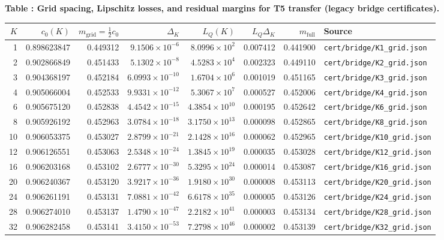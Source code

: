 \label{tab:T5-grid-lip}
\begin{center}
  \small\textbf{Table \thetable: Grid spacing, Lipschitz losses, and residual margins for T5 transfer (legacy bridge certificates).}
\end{center}
\begin{center}
  \small
  \begin{tabular}{rrrrrrrl}
    \toprule
    $K$ & $c_0(K)$ & $m_{\mathrm{grid}}=\tfrac{1}{2}c_0$ & $\Delta_K$ & $L_Q(K)$ & $L_Q\Delta_K$ & $m_{\mathrm{full}}$ & Source \\
    \midrule
    1 & 0.898623847 & 0.449312 & $9.1506\times 10^{-6}$ & $8.0996\times 10^{2}$ & 0.007412 & 0.441900 & \texttt{cert/bridge/K1\_grid.json} \\
    2 & 0.902866849 & 0.451433 & $5.1302\times 10^{-8}$ & $4.5283\times 10^{4}$ & 0.002323 & 0.449110 & \texttt{cert/bridge/K2\_grid.json} \\
    3 & 0.904368197 & 0.452184 & $6.0993\times 10^{-10}$ & $1.6704\times 10^{6}$ & 0.001019 & 0.451165 & \texttt{cert/bridge/K3\_grid.json} \\
    4 & 0.905066004 & 0.452533 & $9.9331\times 10^{-12}$ & $5.3067\times 10^{7}$ & 0.000527 & 0.452006 & \texttt{cert/bridge/K4\_grid.json} \\
    6 & 0.905675120 & 0.452838 & $4.4542\times 10^{-15}$ & $4.3854\times 10^{10}$ & 0.000195 & 0.452642 & \texttt{cert/bridge/K6\_grid.json} \\
    8 & 0.905926192 & 0.452963 & $3.0784\times 10^{-18}$ & $3.1750\times 10^{13}$ & 0.000098 & 0.452865 & \texttt{cert/bridge/K8\_grid.json} \\
    10 & 0.906053375 & 0.453027 & $2.8799\times 10^{-21}$ & $2.1428\times 10^{16}$ & 0.000062 & 0.452965 & \texttt{cert/bridge/K10\_grid.json} \\
    12 & 0.906126551 & 0.453063 & $2.5348\times 10^{-24}$ & $1.3845\times 10^{19}$ & 0.000035 & 0.453028 & \texttt{cert/bridge/K12\_grid.json} \\
    16 & 0.906203168 & 0.453102 & $2.6777\times 10^{-30}$ & $5.3295\times 10^{24}$ & 0.000014 & 0.453087 & \texttt{cert/bridge/K16\_grid.json} \\
    20 & 0.906240367 & 0.453120 & $3.9217\times 10^{-36}$ & $1.9180\times 10^{30}$ & 0.000008 & 0.453113 & \texttt{cert/bridge/K20\_grid.json} \\
    24 & 0.906261191 & 0.453131 & $7.0881\times 10^{-42}$ & $6.6178\times 10^{35}$ & 0.000005 & 0.453126 & \texttt{cert/bridge/K24\_grid.json} \\
    28 & 0.906274010 & 0.453137 & $1.4790\times 10^{-47}$ & $2.2182\times 10^{41}$ & 0.000003 & 0.453134 & \texttt{cert/bridge/K28\_grid.json} \\
    32 & 0.906282458 & 0.453141 & $3.4150\times 10^{-53}$ & $7.2798\times 10^{46}$ & 0.000002 & 0.453139 & \texttt{cert/bridge/K32\_grid.json} \\
    \bottomrule
  \end{tabular}
\end{center}

